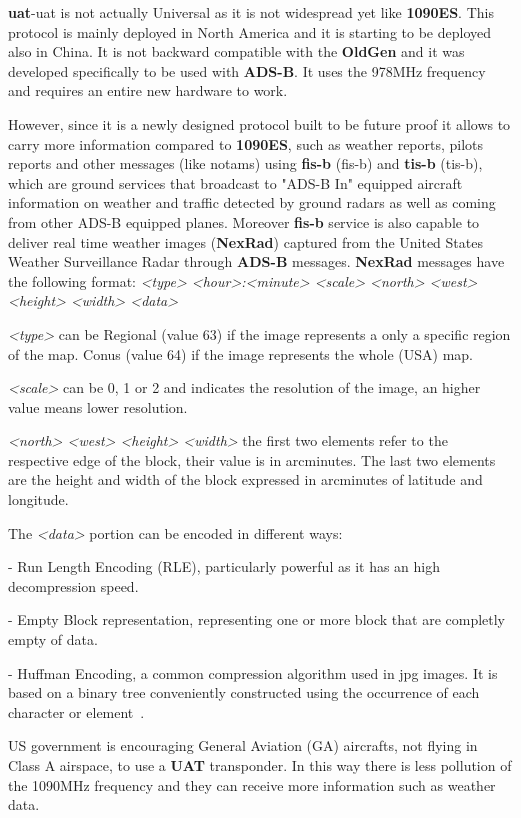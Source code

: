\documentclass[../main.tex]{subfiles}
\begin{document}
\textbf{\acrshort{uat}}-\acrlong{uat} is not actually Universal as it is not widespread yet like \textbf{1090ES}. This protocol is mainly deployed in North America and it is starting to be deployed also in China. It is not backward compatible with the \textbf{OldGen} and it was developed specifically to be used with \textbf{ADS-B}. It uses the 978MHz frequency and requires an entire new hardware to work.

However, since it is a newly designed protocol built to be future proof it allows to carry more information compared to \textbf{1090ES}, such as weather reports, pilots reports and other messages (like \acrshort{notam}s) using  \textbf{\acrshort{fis-b}} (\acrlong{fis-b}) and \textbf{\acrshort{tis-b}} (\acrlong{tis-b}), which are ground services that broadcast to "ADS-B In" equipped aircraft information on weather and traffic detected by ground radars as well as coming from other ADS-B equipped planes. Moreover \textbf{\acrshort{fis-b}} service is also capable to deliver real time weather images (\textbf{NexRad}) captured from the United States Weather Surveillance Radar through \textbf{ADS-B} messages. \textbf{NexRad} messages have the following format: \emph{<type> <hour>:<minute> <scale> <north> <west> <height> <width> <data>}

\emph{<type>} can be Regional (value 63) if the image represents a only a specific region of the map. Conus (value 64) if the image represents the whole (USA) map.

\emph{<scale>} can be 0, 1 or 2 and indicates the resolution of the image, an higher value means lower resolution.

\emph{<north> <west> <height> <width>} the first two elements refer to the respective edge of the block, their value is in arcminutes. The last two elements are the height and width of the block expressed in arcminutes of latitude and longitude.

The \emph{<data>} portion can be encoded in different ways:

- Run Length Encoding (RLE), particularly powerful as it has an high decompression speed.

- Empty Block representation, representing one or more block that are completly empty of data.

- Huffman Encoding, a common compression algorithm used in jpg images. It is based on a binary tree conveniently constructed using the occurrence of each character or element~\cite{huffman}.


US government is encouraging General Aviation (GA) aircrafts, not flying in Class A airspace, to use a \textbf{UAT} transponder. In this way there is less pollution of the 1090MHz frequency and they can receive more information such as weather data.
\end{document}
